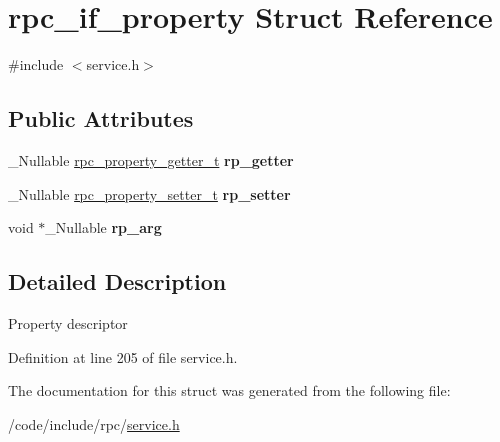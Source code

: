 \hypertarget{structrpc__if__property}{}\section{rpc\+\_\+if\+\_\+property Struct Reference}
\label{structrpc__if__property}


{\ttfamily \#include $<$service.\+h$>$}

\subsection*{Public Attributes}
\begin{DoxyCompactItemize}
\item 
\+\_\+\+Nullable \hyperlink{service_8h_ab438f0c33f3f3876f1c9a23d62134f16}{rpc\+\_\+property\+\_\+getter\+\_\+t} {\bfseries rp\+\_\+getter}\hypertarget{structrpc__if__property_a2b294c7fed3665f1a58020040ec13aee}{}\label{structrpc__if__property_a2b294c7fed3665f1a58020040ec13aee}

\item 
\+\_\+\+Nullable \hyperlink{service_8h_aa8b38d8ab3bafe79a96edaebafe13b8d}{rpc\+\_\+property\+\_\+setter\+\_\+t} {\bfseries rp\+\_\+setter}\hypertarget{structrpc__if__property_a02e1f9e6e5680714278ed6dd67987d67}{}\label{structrpc__if__property_a02e1f9e6e5680714278ed6dd67987d67}

\item 
void $\ast$\+\_\+\+Nullable {\bfseries rp\+\_\+arg}\hypertarget{structrpc__if__property_a81d2953a7a4bdff1775330c29992546b}{}\label{structrpc__if__property_a81d2953a7a4bdff1775330c29992546b}

\end{DoxyCompactItemize}


\subsection{Detailed Description}
Property descriptor 

Definition at line 205 of file service.\+h.



The documentation for this struct was generated from the following file\+:\begin{DoxyCompactItemize}
\item 
/code/include/rpc/\hyperlink{service_8h}{service.\+h}\end{DoxyCompactItemize}
